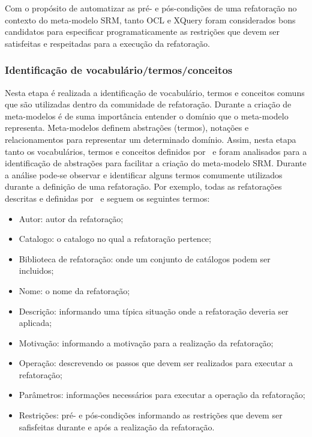 Com o propósito de automatizar as pré- e pós-condições de uma refatoração no contexto do meta-modelo SRM, tanto OCL e XQuery foram considerados bons candidatos para especificar programaticamente as restrições que devem ser satisfeitas e respeitadas para a execução da refatoração.




\subsubsection{Identificação de vocabulário/termos/conceitos}

Nesta etapa é realizada a identificação de vocabulário, termos e conceitos comuns que são utilizadas dentro da comunidade de refatoração. Durante a criação de meta-modelos é de suma importância entender o domínio que o meta-modelo representa. Meta-modelos definem abstrações (termos), notações e relacionamentos para representar um determinado domínio. Assim, nesta etapa tanto os vocabulários, termos e conceitos definidos por~ e  foram analisados para a identificação de abstrações para facilitar a criação do meta-modelo SRM. Durante a análise pode-se observar e identificar alguns termos comumente utilizados durante a definição de uma refatoração. Por exemplo, todas as refatorações descritas e definidas por~ e  seguem os seguintes termos: 

\begin{itemize}
\item Autor: autor da refatoração;
\item Catalogo: o catalogo no qual a refatoração pertence;
\item Biblioteca de refatoração: onde um conjunto de catálogos podem ser incluidos;
\item Nome: o nome da refatoração;
\item Descrição: informando uma típica situação onde a refatoração deveria ser aplicada;
\item Motivação: informando a motivação para a realização da refatoração;
\item Operação: descrevendo os passos que devem ser realizados para executar a refatoração;
\item Parâmetros: informações necessários para executar a operação da refatoração;
\item Restrições: pré- e pós-condições informando as restrições que devem ser safisfeitas durante e após a realização da refatoração.
\end{itemize}

